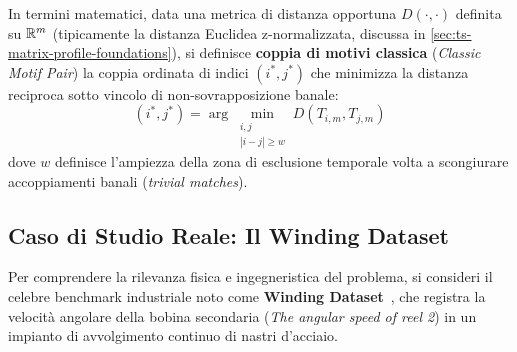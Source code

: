 In termini matematici, data una metrica di distanza opportuna $D(\cdot, \cdot)$ definita su $\mathbb{R}^m$ (tipicamente la distanza Euclidea z-normalizzata, discussa in \autoref{sec:ts-matrix-profile-foundations}), si definisce \textbf{coppia di motivi classica} (\textit{Classic Motif Pair}) la coppia ordinata di indici $(i^*, j^*)$ che minimizza la distanza reciproca sotto vincolo di non-sovrapposizione banale:
\begin{equation}
\label{eq:classic-motif-def}
(i^*, j^*) = \arg\min_{\substack{i, j \\ |i - j| \ge w}} D(T_{i,m}, T_{j,m})
\end{equation}
dove $w$ definisce l'ampiezza della zona di esclusione temporale volta a scongiurare accoppiamenti banali (\textit{trivial matches}).

\FloatBarrier
\subsection{Caso di Studio Reale: Il Winding Dataset}
\label{subsec:ts-winding-dataset}

Per comprendere la rilevanza fisica e ingegneristica del problema, si consideri il celebre benchmark industriale noto come \textbf{Winding Dataset}~\cite{yeh2016}, che registra la velocit\`a angolare della bobina secondaria (\textit{The angular speed of reel 2}) in un impianto di avvolgimento continuo di nastri d'acciaio.

